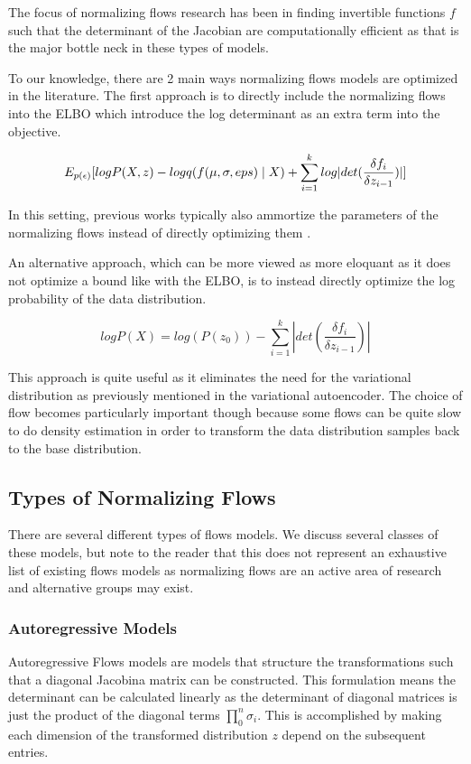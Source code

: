 The focus of normalizing flows research has been in finding invertible functions $f$ such that the determinant of the Jacobian are computationally efficient as that is the major bottle neck in these types of models. 

To our knowledge, there are 2 main ways normalizing flows models are optimized in the literature. The first approach is to directly include the normalizing flows into the \ac{ELBO} which introduce the log determinant as an extra term into the objective.

\begin{equation}
E_{p(\epsilon)} [ log P(X, z) - log q( f(\mu, \sigma, eps) \; | \;{X}) + \sum_{i=1}^{k}log |det (\frac{\delta f_{i}}{\delta z_{i-1}}) | ]
\end{equation}

In this setting, previous works typically also ammortize the parameters of the normalizing flows instead of directly optimizing them  \cite{rezende2015VIwithNF,tomczak2016Householder,vdberg2018sylvester}. 

An alternative approach, which can be more viewed as more eloquant as it does not optimize a bound like with the \ac{ELBO}, is to instead directly optimize the log probability of the data distribution.
 
\begin{equation}
	logP(X) = log(P(z_{0})) - \sum_{i=1}^{k} |det (\frac{\delta f_{i}}{\delta z_{i-1}}) |
\end{equation}

This approach is quite useful as it eliminates the need for the variational distribution as previously mentioned in the variational autoencoder. The choice of flow becomes particularly important though because some flows can be quite slow to do density estimation in order to transform the data distribution samples back to the base distribution. 




\subsection{Types of Normalizing Flows}

There are several different types of flows models. We discuss several classes of these models, but note to the reader that this does not represent an exhaustive list of existing flows models as normalizing flows are an active area of research and alternative groups may exist. 

\subsubsection{Autoregressive Models}
Autoregressive Flows models are models that structure the transformations such that a diagonal Jacobina matrix can be constructed. This formulation means the determinant can be calculated linearly as the determinant of diagonal matrices is just the product of the diagonal terms $\prod_{0}^{n} \sigma_{i}$. This is accomplished by making each dimension of the transformed distribution $z$ depend on the subsequent entries.



